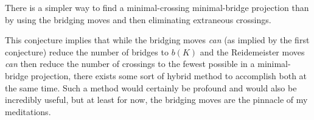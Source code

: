 \documentclass[titlepage]{article}
\begin{document}
\begin{conj}
    There is a simpler way to find a minimal-crossing minimal-bridge projection than by using the bridging moves and then eliminating extraneous crossings.
\end{conj}

This conjecture implies that while the bridging moves \emph{can} (as implied by the first conjecture) reduce the number of bridges to $b(K)$ and the Reidemeister moves \emph{can} then reduce the number of crossings to the fewest possible in a minimal-bridge projection, there exists some sort of hybrid method to accomplish both at the same time. Such a method would certainly be profound and would also be incredibly useful, but at least for now, the bridging moves are the pinnacle of my meditations.
\newpage
\end{document}
